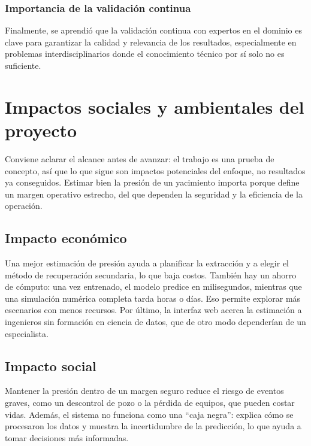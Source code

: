 \documentclass[12pt,a4paper]{article}
\begin{document}
\subsubsection{Importancia de la validación continua}

Finalmente, se aprendió que la validación continua con expertos en el dominio es clave para 
garantizar la calidad y relevancia de los resultados, especialmente en problemas interdisciplinarios
donde el conocimiento técnico por sí solo no es suficiente.

\newpage
\section{Impactos sociales y ambientales del proyecto}

Conviene aclarar el alcance antes de avanzar: el trabajo es una prueba de concepto, así
que lo que sigue son impactos potenciales del enfoque, no resultados ya conseguidos.
Estimar bien la presión de un yacimiento importa porque define un margen operativo
estrecho, del que dependen la seguridad y la eficiencia de la operación.

\subsection{Impacto económico}

Una mejor estimación de presión ayuda a planificar la extracción y a elegir el método de
recuperación secundaria, lo que baja costos. También hay un ahorro de cómputo: una vez
entrenado, el modelo predice en milisegundos, mientras que una simulación numérica completa
tarda horas o días. Eso permite explorar más escenarios con menos recursos. Por último, la
interfaz web acerca la estimación a ingenieros sin formación en ciencia de datos, que de
otro modo dependerían de un especialista.

\subsection{Impacto social}

Mantener la presión dentro de un margen seguro reduce el riesgo de eventos graves, como un
descontrol de pozo o la pérdida de equipos, que pueden costar vidas. Además, el sistema no
funciona como una ``caja negra'': explica cómo se procesaron los datos y muestra la
incertidumbre de la predicción, lo que ayuda a tomar decisiones más informadas.
\end{document}
